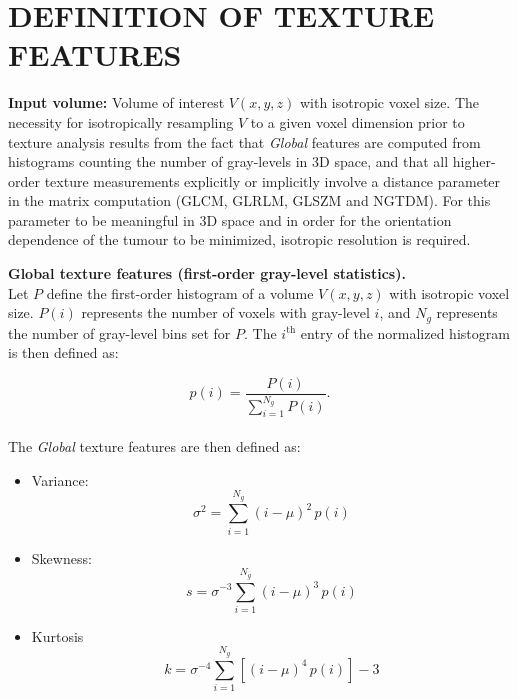 \documentclass{article}
\begin{document}
\section*{DEFINITION OF TEXTURE FEATURES}
\bigskip

\noindent \textbf{Input volume:} Volume of interest $V(x,y,z)$ with isotropic voxel size. The necessity for isotropically resampling $V$ to a given voxel dimension prior to texture analysis results from the fact that \textit{Global} features are computed from histograms counting the number of gray-levels in 3D space, and that all higher-order texture measurements explicitly or implicitly involve a distance parameter in the matrix computation (GLCM, GLRLM, GLSZM and NGTDM). For this parameter to be meaningful in 3D space and in order for the orientation dependence of the tumour to be minimized, isotropic resolution is required.
\bigskip \bigskip

\noindent \textbf{Global texture features (first-order gray-level statistics).} \\
Let $P$ define the first-order histogram of a volume $V(x,y,z)$ with isotropic voxel size. $P(i)$ represents the number of voxels with gray-level $i$, and $N_g$ represents the number of gray-level bins set for $P$. The $i^{\mathrm{th}}$ entry of the normalized histogram is then defined as:

\[p(i) = \frac{P(i)}{\sum_{i=1}^{N_g} P(i)}.\] \\

\noindent The \textit{Global} texture features are then defined as:

\begin{itemize}
	\item Variance:
		  \[\sigma^2 = \sum_{i=1}^{N_g} (i-\mu)^2\,p(i)\] 
	\item Skewness:
		  \[s = \sigma^{-3} \sum_{i=1}^{N_g} (i-\mu)^3\,p(i)\]
	\item Kurtosis
		  \[k = \sigma^{-4} \sum_{i=1}^{N_g} \left[(i-\mu)^4\,p(i)\right]-3\]
	\\
\end{itemize}
\end{document}
